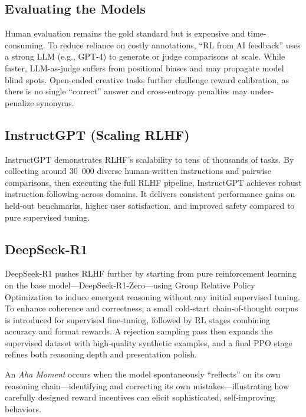 \documentclass{article}
\begin{document}
\subsection{Evaluating the Models}

Human evaluation remains the gold standard but is expensive and time-consuming. To reduce reliance on costly annotations, “RL from AI feedback” uses a strong LLM (e.g., GPT-4) to generate or judge comparisons at scale. While faster, LLM-as-judge suffers from positional biases and may propagate model blind spots. Open-ended creative tasks further challenge reward calibration, as there is no single “correct” answer and cross-entropy penalties may under-penalize synonyms.

\subsection{InstructGPT (Scaling RLHF)}

InstructGPT demonstrates RLHF’s scalability to tens of thousands of tasks. By collecting around 30 000 diverse human‑written instructions and pairwise comparisons, then executing the full RLHF pipeline, InstructGPT achieves robust instruction following across domains. It delivers consistent performance gains on held‑out benchmarks, higher user satisfaction, and improved safety compared to pure supervised tuning.

\subsection{DeepSeek‑R1}

DeepSeek‑R1 pushes RLHF further by starting from pure reinforcement learning on the base model—DeepSeek‑R1‑Zero—using Group Relative Policy Optimization to induce emergent reasoning without any initial supervised tuning. To enhance coherence and correctness, a small cold‑start chain‑of‑thought corpus is introduced for supervised fine‑tuning, followed by RL stages combining accuracy and format rewards. A rejection sampling pass then expands the supervised dataset with high‑quality synthetic examples, and a final PPO stage refines both reasoning depth and presentation polish.

An \emph{Aha Moment} occurs when the model spontaneously “reflects” on its own reasoning chain—identifying and correcting its own mistakes—illustrating how carefully designed reward incentives can elicit sophisticated, self‑improving behaviors.
\end{document}
